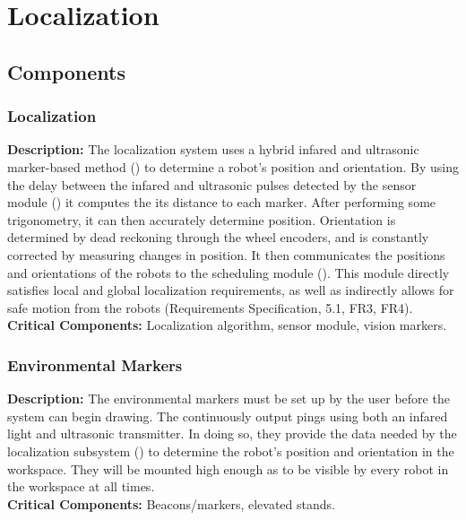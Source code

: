 
\section{Localization}
\label{sec:localization}

\subsection{Components}

\subsubsection{Localization}
\label{sec:subsystem_localization}
\textbf{Description:} The localization system uses a hybrid infared and ultrasonic marker-based method () to determine a robot's position and orientation. By using the delay between the infared and ultrasonic pulses detected by the sensor module () it computes the its distance to each marker. After performing some trigonometry, it can then accurately determine position. Orientation is determined by dead reckoning through the wheel encoders, and is constantly corrected by measuring changes in position. It then communicates the positions and orientations of the robots to the scheduling module (). This module directly satisfies local and global localization requirements, as well as indirectly allows for safe motion from the robots (Requirements Specification, 5.1, FR3, FR4). \\
\textbf{Critical Components:} Localization algorithm, sensor module, vision markers. \\

\subsubsection{Environmental Markers}
\label{sec:subsystem_markers}
\textbf{Description:} The environmental markers must be set up by the user before the system can begin drawing. The continuously output pings using both an infared light and ultrasonic transmitter. In doing so, they provide the data needed by the localization subsystem () to determine the robot's position and orientation in the workspace. They will be mounted high enough as to be visible by every robot in the workspace at all times. \\
\textbf{Critical Components:} Beacons/markers, elevated stands. \\

